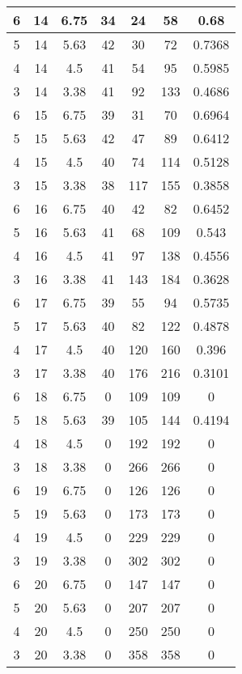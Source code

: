 \documentclass[letterpaper, 12pt]{article}
\begin{document}
\begin{longtable}{|c|c|c|c|c|c|c|}
\hline
6 & 14 & 6.75 & 34 & 24 & 58 & 0.68 \\
\hline
5 & 14 & 5.63 & 42 & 30 & 72 & 0.7368 \\
\hline
4 & 14 & 4.5 & 41 & 54 & 95 & 0.5985 \\
\hline
3 & 14 & 3.38 & 41 & 92 & 133 & 0.4686 \\
\hline
6 & 15 & 6.75 & 39 & 31 & 70 & 0.6964 \\
\hline
5 & 15 & 5.63 & 42 & 47 & 89 & 0.6412 \\
\hline
4 & 15 & 4.5 & 40 & 74 & 114 & 0.5128 \\
\hline
3 & 15 & 3.38 & 38 & 117 & 155 & 0.3858 \\
\hline
6 & 16 & 6.75 & 40 & 42 & 82 & 0.6452 \\
\hline
5 & 16 & 5.63 & 41 & 68 & 109 & 0.543 \\
\hline
4 & 16 & 4.5 & 41 & 97 & 138 & 0.4556 \\
\hline
3 & 16 & 3.38 & 41 & 143 & 184 & 0.3628 \\
\hline
6 & 17 & 6.75 & 39 & 55 & 94 & 0.5735 \\
\hline
5 & 17 & 5.63 & 40 & 82 & 122 & 0.4878 \\
\hline
4 & 17 & 4.5 & 40 & 120 & 160 & 0.396 \\
\hline
3 & 17 & 3.38 & 40 & 176 & 216 & 0.3101 \\
\hline
6 & 18 & 6.75 & 0 & 109 & 109 & 0 \\
\hline
5 & 18 & 5.63 & 39 & 105 & 144 & 0.4194 \\
\hline
4 & 18 & 4.5 & 0 & 192 & 192 & 0 \\
\hline
3 & 18 & 3.38 & 0 & 266 & 266 & 0 \\
\hline
6 & 19 & 6.75 & 0 & 126 & 126 & 0 \\
\hline
5 & 19 & 5.63 & 0 & 173 & 173 & 0 \\
\hline
4 & 19 & 4.5 & 0 & 229 & 229 & 0 \\
\hline
3 & 19 & 3.38 & 0 & 302 & 302 & 0 \\
\hline
6 & 20 & 6.75 & 0 & 147 & 147 & 0 \\
\hline
5 & 20 & 5.63 & 0 & 207 & 207 & 0 \\
\hline
4 & 20 & 4.5 & 0 & 250 & 250 & 0 \\
\hline
3 & 20 & 3.38 & 0 & 358 & 358 & 0 \\
\hline
\end{longtable}
\end{document}
